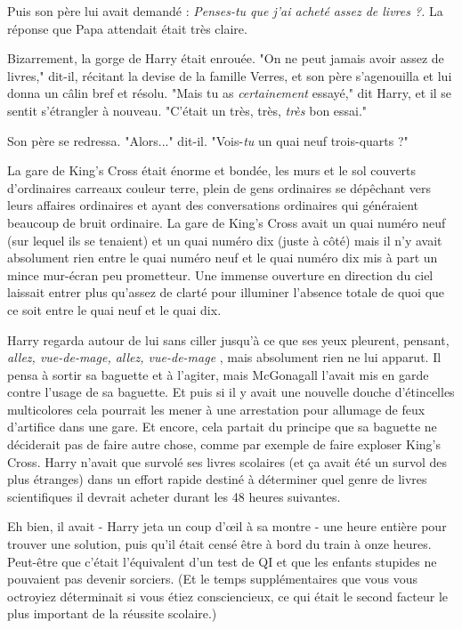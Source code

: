 Puis son père lui avait demandé : \emph{Penses-tu que j'ai acheté assez de livres ?.}  La réponse que Papa attendait était très claire.

Bizarrement, la gorge de Harry était enrouée. "On ne peut jamais avoir assez de livres," dit-il, récitant la devise de la famille Verres, et son père s'agenouilla et lui donna un câlin bref et résolu. "Mais tu as \emph{certainement}  essayé," dit Harry, et il se sentit s'étrangler à nouveau. "C'était un très, très, \emph{très}  bon essai."

Son père se redressa. "Alors..." dit-il. "Vois-\emph{tu}  un quai neuf trois-quarts ?"

La gare de King's Cross était énorme et bondée, les murs et le sol couverts d'ordinaires carreaux couleur terre, plein de gens ordinaires se dépêchant vers leurs affaires ordinaires et ayant des conversations ordinaires qui généraient beaucoup de bruit ordinaire. La gare de King's Cross avait un quai numéro neuf (sur lequel ils se tenaient) et un quai numéro dix (juste à côté) mais il n'y avait absolument rien entre le quai numéro neuf et le quai numéro dix mis à part un mince mur-écran peu prometteur. Une immense ouverture en direction du ciel laissait entrer plus qu'assez de clarté pour illuminer l'absence totale de quoi que ce soit entre le quai neuf et le quai dix.

Harry regarda autour de lui sans ciller jusqu'à ce que ses yeux pleurent, pensant, \emph{allez, vue-de-mage, allez, vue-de-mage} , mais absolument rien ne lui apparut. Il pensa à sortir sa baguette et à l'agiter, mais McGonagall l'avait mis en garde contre l'usage de sa baguette. Et puis si il y avait une nouvelle douche d'étincelles multicolores cela pourrait les mener à une arrestation pour allumage de feux d'artifice dans une gare. Et encore, cela partait du principe que sa baguette ne déciderait pas de faire autre chose, comme par exemple de faire exploser King's Cross. Harry n'avait que survolé ses livres scolaires (et ça avait été un survol des plus étranges) dans un effort rapide destiné à déterminer quel genre de livres scientifiques il devrait acheter durant les 48 heures suivantes.

Eh bien, il avait - Harry jeta un coup d'œil à sa montre - une heure entière pour trouver une solution, puis qu'il était censé être à bord du train à onze heures. Peut-être que c'était l'équivalent d'un test de QI et que les enfants stupides ne pouvaient pas devenir sorciers. (Et le temps supplémentaires que vous vous octroyiez déterminait si vous étiez consciencieux, ce qui était le second facteur le plus important de la réussite scolaire.)

